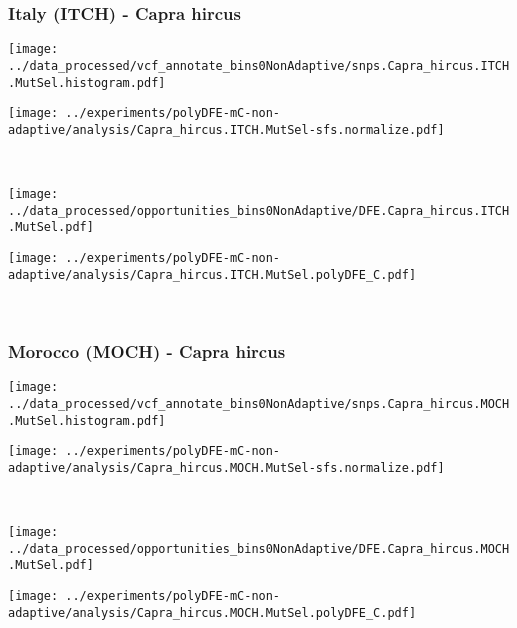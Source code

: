 \subsubsection{Italy (ITCH) - Capra hircus}

\begin{minipage}{0.49\linewidth}
    \texttt{[image: ../data\_processed/vcf\_annotate\_bins0NonAdaptive/snps.Capra\_hircus.ITCH.MutSel.histogram.pdf]}
\end{minipage}
\begin{minipage}{0.49\linewidth}
    \texttt{[image: ../experiments/polyDFE-mC-non-adaptive/analysis/Capra\_hircus.ITCH.MutSel-sfs.normalize.pdf]}
\end{minipage}
\\
\begin{minipage}{0.49\linewidth}
    \texttt{[image: ../data\_processed/opportunities\_bins0NonAdaptive/DFE.Capra\_hircus.ITCH.MutSel.pdf]}
\end{minipage}
\begin{minipage}{0.49\linewidth}
    \texttt{[image: ../experiments/polyDFE-mC-non-adaptive/analysis/Capra\_hircus.ITCH.MutSel.polyDFE\_C.pdf]}
\end{minipage}
\\

\subsubsection{Morocco (MOCH) - Capra hircus}

\begin{minipage}{0.49\linewidth}
    \texttt{[image: ../data\_processed/vcf\_annotate\_bins0NonAdaptive/snps.Capra\_hircus.MOCH.MutSel.histogram.pdf]}
\end{minipage}
\begin{minipage}{0.49\linewidth}
    \texttt{[image: ../experiments/polyDFE-mC-non-adaptive/analysis/Capra\_hircus.MOCH.MutSel-sfs.normalize.pdf]}
\end{minipage}
\\
\begin{minipage}{0.49\linewidth}
    \texttt{[image: ../data\_processed/opportunities\_bins0NonAdaptive/DFE.Capra\_hircus.MOCH.MutSel.pdf]}
\end{minipage}
\begin{minipage}{0.49\linewidth}
    \texttt{[image: ../experiments/polyDFE-mC-non-adaptive/analysis/Capra\_hircus.MOCH.MutSel.polyDFE\_C.pdf]}
\end{minipage}
\\

